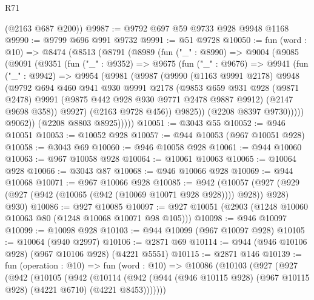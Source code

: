 \begin{lexlean}{R71}
\begin{coremodule}
      (@2163 @687 @200))
@9987 := @9792 @697 @59 @9733 @928 @9948 @1168
@9990 := @9799 @696 @991 @9732
@9991 := @51 @9728
@10050 := fun (word : @10) =>
  @8474
    (@8513
      (@8791
        (@8989
          (fun ("_" : @8990) =>
          @9004
            (@9085
              (@9091
                (@9351
                  (fun ("_" : @9352) =>
                  @9675
                    (fun ("_" : @9676) =>
                    @9941
                      (fun ("_" : @9942) =>
                      @9954
                        (@9981
                          (@9987
                            (@9990
                              (@1163 @9991 @2178)
                              @9948
                              (@9792
                                @694
                                @460
                                @941
                                @930
                                @9991
                                @2178
                                (@9853
                                  @659
                                  @931
                                  @928
                                  (@9871 @2478)
                                  @9991
                                  (@9875 @442 @928 @930 @9771 @2478 @9887 @9912)
                                  (@2147 @9698 @358))
                                @9927)
                              (@2163 @9728 @456))
                            @9825))
                        (@2208 @8397 @9730)))))
                @9062))
            (@2208 @8803 @8925)))))
@10051 := @3043 @55
@10052 := @946 @10051
@10053 := @10052 @928
@10057 := @944 @10053 (@967 @10051 @928)
@10058 := @3043 @69
@10060 := @946 @10058 @928
@10061 := @944 @10060
@10063 := @967 @10058 @928
@10064 := @10061 @10063
@10065 := @10064 @928
@10066 := @3043 @87
@10068 := @946 @10066 @928
@10069 := @944 @10068
@10071 := @967 @10066 @928
@10085 := @942
    (@10057 (@927 (@929 (@927 (@942 (@10065 (@942 (@10069 @10071 @928 @928)))) @928)) @928) @930)
@10086 := @927 @10085
@10097 := @927 @10051 (@2903 (@1248 @10060 @10063 @80 (@1248 @10068 @10071 @98 @105)))
@10098 := @946 @10097
@10099 := @10098 @928
@10103 := @944 @10099 (@967 @10097 @928)
@10105 := @10064 (@940 @2997)
@10106 := @2871 @69
@10114 := @944 (@946 @10106 @928) (@967 @10106 @928) (@4221 @5551)
@10115 := @2871 @146
@10139 := fun (operation : @10) =>
  fun (word : @10) =>
  @10086
    (@10103
      (@927
        (@927
          (@942
            (@10105
              (@942
                (@10114
                  (@942
                    (@944 (@946 @10115 @928) (@967 @10115 @928) (@4221 @6710) (@4221 @8453)))))))

\end{coremodule}
\end{lexlean}
